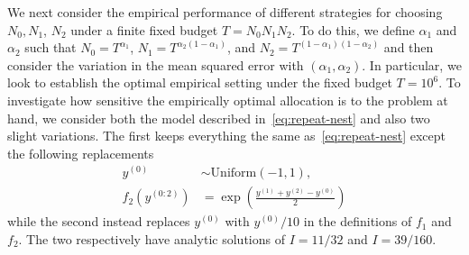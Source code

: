 We next consider the empirical performance of different strategies for choosing $N_0, N_1$, $N_2$ under a 
finite fixed budget $T=N_0N_1N_2$.
To do this, we define $\alpha_1$ and $\alpha_2$ such that $N_0 = T^{\alpha_1}$, 
$N_1 = T^{\alpha_2(1-\alpha_1)}$, and $N_2 = T^{(1-\alpha_1)(1-\alpha_2)}$ and then consider the variation in the
mean squared error with $(\alpha_1,\alpha_2)$.  In particular, we look to establish the optimal empirical
setting under the fixed budget $T=10^6$.  To investigate how sensitive the empirically optimal 
allocation is to the problem at hand, we consider both the model described in~\eqref{eq:repeat-nest} and 
also two slight variations.  The first keeps everything the same as~\eqref{eq:repeat-nest} except the following replacements
\begin{subequations}
	\label{eq:repeat-nest2}
	\begin{align}
		y^{(0)} &\sim \mathrm{Uniform}(-1,1), \\
		f_2 \left(y^{(0:2)}\right)&=\exp\left(\frac{y^{(1)}+y^{(2)}-y^{(0)}}{2}\right)
	\end{align}
\end{subequations}
while the second instead replaces $y^{(0)}$ with $y^{(0)}/10$ in the definitions of $f_1$ and $f_2$.  The two
respectively have analytic solutions of $I=11/32$ and $I=39/160$.

